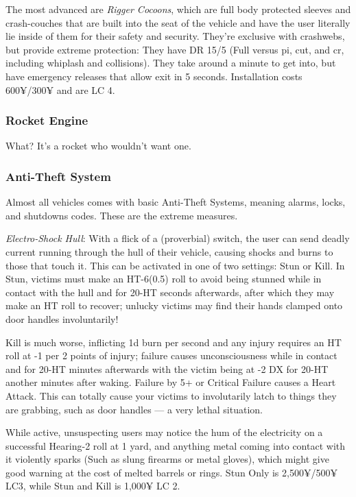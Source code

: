 \begin{multicols*}{2}
	The most advanced are \textit{Rigger Cocoons}, which are full body protected sleeves and crash-couches that are built into the seat of the vehicle and have the user literally lie inside of them for their safety and security. They're exclusive with crashwebs, but provide extreme protection: They have DR 15/5 (Full versus pi, cut, and cr, including whiplash and collisions). They take around a minute to get into, but have emergency releases that allow exit in 5 seconds. Installation costs 600¥/300¥ and are LC 4. 
	
	\subsubsection{Rocket Engine}
	
	What? It's a rocket who wouldn't want one. %
 	
	\subsubsection{Anti-Theft System}
	
	Almost all vehicles comes with basic Anti-Theft Systems, meaning alarms, locks, and shutdowns codes. These are the extreme measures.
	
	\textit{Electro-Shock Hull}: With a flick of a (proverbial) switch, the user can send deadly current running through the hull of their vehicle, causing shocks and burns to those that touch it. This can be activated in one of two settings: Stun or Kill. In Stun, victims must make an HT-6(0.5) roll to avoid being stunned while in contact with the hull and for 20-HT seconds afterwards, after which they may make an HT roll to recover; unlucky victims may find their hands clamped onto door handles involuntarily! 
	
	Kill is much worse, inflicting 1d burn per second and any injury requires an HT roll at -1 per 2 points of injury; failure causes unconsciousness while in contact and for 20-HT minutes afterwards with the victim being at -2 DX for 20-HT another minutes after waking. Failure by 5+ or Critical Failure causes a Heart Attack. This can totally cause your victims to involutarily latch to things they are grabbing, such as door handles — a very lethal situation.
	
	While active, unsuspecting users may notice the hum of the electricity on a successful Hearing-2 roll at 1 yard, and anything metal coming into contact with it violently sparks (Such as slung firearms or metal gloves), which might give good warning at the cost of melted barrels or rings. Stun Only is 2,500¥/500¥ LC3, while Stun and Kill is 1,000¥ LC 2.
	

\end{multicols*}
